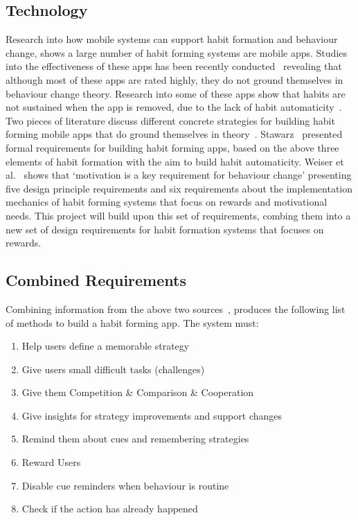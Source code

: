 \subsection{Technology}
Research into how mobile systems can support habit formation and behaviour change, shows a large number of habit forming systems are mobile apps. Studies into the effectiveness of these apps has been recently conducted~\cite{article_beyond_self_tracking_designing_apps, article_dont_kick_habit} revealing that although most of these apps are rated highly, they do not ground themselves in behaviour change theory. Research into some of these apps show that habits are not sustained when the app is removed, due to the lack of habit automaticity~\cite{article_beyond_self_tracking_designing_apps}.\newline
\newline
Two pieces of literature discuss different concrete strategies for building habit forming mobile apps that do ground themselves in theory~\cite{thesis_kathy, article_taxonomy_motivational_affordances_meaningful}. Stawarz~\cite{thesis_kathy} presented formal requirements for building habit forming apps, based on the above three elements of habit formation with the aim to build habit automaticity. Weiser et al.~\cite{article_taxonomy_motivational_affordances_meaningful} shows that `motivation is a key requirement for behaviour change' presenting five design principle requirements and six requirements about the implementation mechanics of habit forming systems that focus on rewards and motivational needs. This project will build upon this set of requirements, combing them into a new set of design requirements for habit formation systems that focuses on rewards.

\subsection{Combined Requirements}
Combining information from the above two sources~\cite{thesis_kathy, article_taxonomy_motivational_affordances_meaningful}, produces the following list of methods to build a habit forming app.\newline
\newline
The system must:

\begin{enumerate}
  \item Help users define a memorable strategy
  \item Give users small difficult tasks (challenges)
  \item Give them Competition \& Comparison \& Cooperation
  \item Give insights for strategy improvements and support changes
  \item Remind them about cues and remembering strategies
  \item Reward Users
  \item Disable cue reminders when behaviour is routine
  \item Check if the action has already happened
\end{enumerate}

